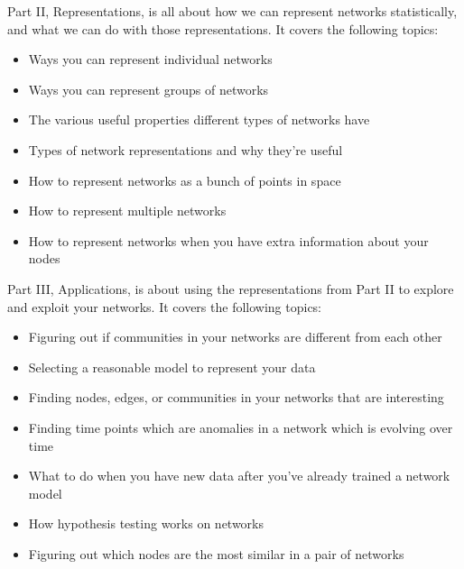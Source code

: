 \documentclass[letterpaper,10pt,english]{jupyterBook}
\begin{document}
\sphinxAtStartPar
Part II, Representations, is all about how we can represent networks statistically, and what we can do with those representations. It covers the following topics:
\begin{itemize}
\item {} 
\sphinxAtStartPar
Ways you can represent individual networks

\item {} 
\sphinxAtStartPar
Ways you can represent groups of networks

\item {} 
\sphinxAtStartPar
The various useful properties different types of networks have

\item {} 
\sphinxAtStartPar
Types of network representations and why they’re useful

\item {} 
\sphinxAtStartPar
How to represent networks as a bunch of points in space

\item {} 
\sphinxAtStartPar
How to represent multiple networks

\item {} 
\sphinxAtStartPar
How to represent networks when you have extra information about your nodes

\end{itemize}

\sphinxAtStartPar
Part III, Applications, is about using the representations from Part II to explore and exploit your networks. It covers the following topics:
\begin{itemize}
\item {} 
\sphinxAtStartPar
Figuring out if communities in your networks are different from each other

\item {} 
\sphinxAtStartPar
Selecting a reasonable model to represent your data

\item {} 
\sphinxAtStartPar
Finding nodes, edges, or communities in your networks that are interesting

\item {} 
\sphinxAtStartPar
Finding time points which are anomalies in a network which is evolving over time

\item {} 
\sphinxAtStartPar
What to do when you have new data after you’ve already trained a network model

\item {} 
\sphinxAtStartPar
How hypothesis testing works on networks

\item {} 
\sphinxAtStartPar
Figuring out which nodes are the most similar in a pair of networks

\end{itemize}
\end{document}

